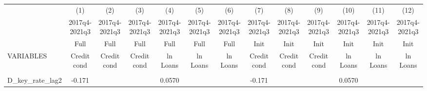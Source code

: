 \documentclass[]{article}
\begin{document}
\begin{center}
\begin{tabular}{lcccccccccccc} \hline
 & (1) & (2) & (3) & (4) & (5) & (6) & (7) & (8) & (9) & (10) & (11) & (12) \\
 & 2017q4-2021q3 & 2017q4-2021q3 & 2017q4-2021q3 & 2017q4-2021q3 & 2017q4-2021q3 & 2017q4-2021q3 & 2017q4-2021q3 & 2017q4-2021q3 & 2017q4-2021q3 & 2017q4-2021q3 & 2017q4-2021q3 & 2017q4-2021q3 \\
 & Full & Full & Full & Full & Full & Full & Init & Init & Init & Init & Init & Init \\
VARIABLES & Credit cond & Credit cond & Credit cond & ln Loans & ln Loans & ln Loans & Credit cond & Credit cond & Credit cond & ln Loans & ln Loans & ln Loans \\ \hline
\vspace{4pt} & \begin{footnotesize}\end{footnotesize} & \begin{footnotesize}\end{footnotesize} & \begin{footnotesize}\end{footnotesize} & \begin{footnotesize}\end{footnotesize} & \begin{footnotesize}\end{footnotesize} & \begin{footnotesize}\end{footnotesize} & \begin{footnotesize}\end{footnotesize} & \begin{footnotesize}\end{footnotesize} & \begin{footnotesize}\end{footnotesize} & \begin{footnotesize}\end{footnotesize} & \begin{footnotesize}\end{footnotesize} & \begin{footnotesize}\end{footnotesize} \\
D\_key\_rate\_lag2 & -0.171 &  &  & 0.0570 &  &  & -0.171 &  &  & 0.0570 &  &  \\

\end{tabular}
\end{center}
\end{document}
